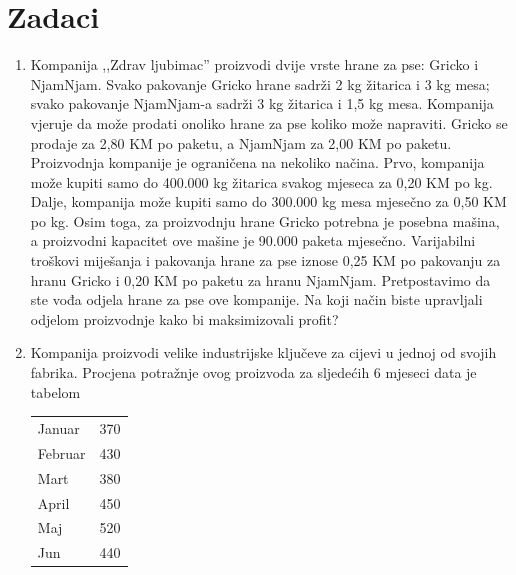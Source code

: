 \documentclass[b5paper, utf8, 11pt, colorlinks]{book}
\theoremstyle{definition}
\begin{document}
 \section{Zadaci}
 \begin{enumerate}
	\item  Kompanija ,,Zdrav ljubimac'' proizvodi dvije vrste hrane za pse: Gricko i NjamNjam. Svako pakovanje Gricko hrane sadrži 2 kg žitarica i 3 kg mesa; svako pakovanje NjamNjam-a sadrži 3 kg žitarica i 1,5 kg mesa. Kompanija vjeruje da može prodati onoliko hrane za pse koliko može napraviti. Gricko se prodaje za   2,80 KM po paketu, a NjamNjam  za 2,00 KM po paketu. Proizvodnja kompanije je ograničena na nekoliko načina. Prvo, kompanija može kupiti samo do 400.000 kg žitarica svakog mjeseca za 0,20 KM po kg. Dalje, kompanija može
	kupiti samo do 300.000 kg mesa mjesečno za 0,50 KM po kg. Osim toga, za proizvodnju hrane Gricko  potrebna je posebna mašina, a proizvodni kapacitet ove mašine je 90.000 paketa mjesečno. Varijabilni troškovi miješanja i pakovanja hrane za pse iznose 0,25 KM po pakovanju za hranu Gricko i 0,20 KM po paketu za hranu NjamNjam.  
	Pretpostavimo da ste vođa odjela hrane za pse  ove kompanije. Na koji način biste  upravljali odjelom proizvodnje kako bi maksimizovali profit? 
	\item %
	 Kompanija proizvodi velike industrijske ključeve za cijevi u jednoj od svojih fabrika. 
	 Procjena potražnje ovog proizvoda za sljedećih 6 mjeseci data je tabelom
 \begin{center}
    \begin{tabular}{lc}\hline
		 Januar  & 370 \\
		 Februar & 430 \\
		 Mart    & 380 \\
		 April   & 450 \\
		 Maj     & 520 \\
		 Jun     & 440 \\
		 \hline
	\end{tabular}  
\end{center}	
	

\end{enumerate}
\end{document}
